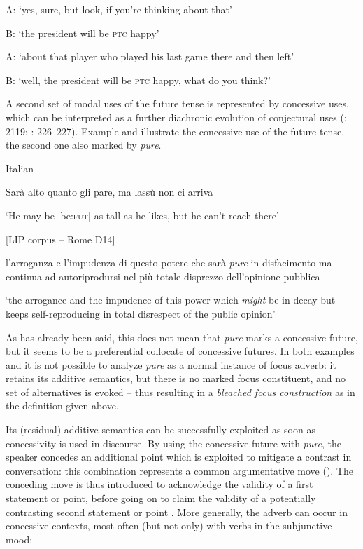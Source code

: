 A:  ‘yes, sure, but look, if you’re thinking about that’

B:  ‘the president will be \textsc{ptc} happy’

A:  ‘about that player who played his last game there and then left’

B:  ‘well, the president will be \textsc{ptc} happy, what do you think?’
    \z

A second set of modal uses of the future tense is represented by concessive uses, which can be interpreted as a further diachronic evolution of conjectural uses (\citealt{Squartini2012}: 2119; \citealt{BybeeEtAl1994}: 226–227). Example  and  illustrate the concessive use of the future tense, the second one also marked by \textit{pure}.

\ea%
    \label{ex:key:27}

          Italian \citep[2121]{Squartini2012}

  Sarà alto quanto gli pare, ma lassù non ci arriva

\glt ‘He may be [be:\textsc{fut}] as tall as he likes, but he can’t reach there’
    \z

\ea%
    \label{ex:key:28}

          [LIP corpus – Rome D14]

l’arroganza e l’impudenza di questo potere che sarà \textit{pure} in disfacimento ma continua ad autoriprodursi nel più totale disprezzo dell’opinione pubblica

\glt ‘the arrogance and the impudence of this power which \textit{might} be in decay but keeps self-reproducing in total disrespect of the public opinion’
    \z

As has already been said, this does not mean that \textit{pure} marks a concessive future, but it seems to be a preferential collocate of concessive futures. In both examples  and  it is not possible to analyze \textit{pure} as a normal instance of focus adverb: it retains its additive semantics, but there is no marked focus constituent, and no set of alternatives is evoked – thus resulting in a \textit{bleached focus construction} as in the definition given above.

\hspace*{-.5pt}Its (residual) additive semantics can be successfully exploited as soon as conces\-sivity is used in discourse. By using the concessive future with \textit{pure}, the speaker concedes an additional point which is exploited to mitigate a contrast in conversation: this combination represents a common argumentative move (\citealt{AnscombreDucrot1983}). The conceding move is thus introduced to acknowledge the validity of a first statement or point, before going on to claim the validity of a potentially contrasting second statement or point \citep[2123]{Squartini2012}. More generally, the adverb can occur in concessive contexts, most often (but not only) with verbs in the subjunctive mood:

